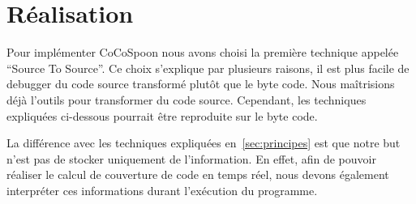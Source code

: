 \section{Réalisation}

Pour implémenter CoCoSpoon nous avons choisi la première technique appelée “Source To Source”. Ce choix s'explique par plusieurs raisons, il est plus facile de debugger du code source transformé plutôt que le byte code. Nous maîtrisions déjà l'outils pour transformer du code source. Cependant, les techniques expliquées ci-dessous pourrait être reproduite sur le byte code. \par La différence avec les techniques expliquées en~\ref{sec:principes} est que notre but n'est pas de stocker uniquement de l'information. En effet, afin de pouvoir réaliser le calcul de couverture de code en temps réel, nous devons également interpréter ces informations durant l'exécution du programme. 
